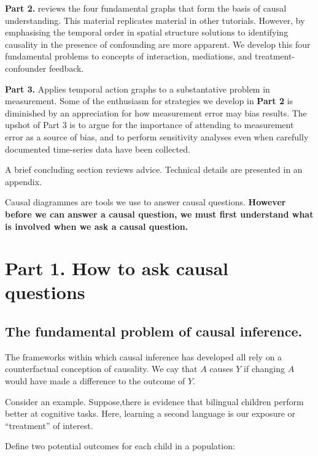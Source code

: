 \documentclass[
  singlecolumn]{report}
\begin{document}
\textbf{Part 2.} reviews the four fundamental graphs that form the basis
of causal understanding. This material replicates material in other
tutorials. However, by emphasising the temporal order in spatial
structure solutions to identifying causality in the presence of
confounding are more apparent. We develop this four fundamental problems
to concepts of interaction, mediations, and treatment-confounder
feedback.

\textbf{Part 3.} Applies temporal action graphs to a substantative
problem in measurement. Some of the enthusiasm for strategies we develop
in \textbf{Part 2} is diminished by an appreciation for how measurement
error may bias results. The upshot of Part 3 is to argue for the
importance of attending to measurement error as a source of bias, and to
perform sensitivity analyses even when carefully documented time-series
data have been collected.

A brief concluding section reviews advice. Technical details are
presented in an appendix.

Causal diagrammes are tools we use to answer causal questions.
\textbf{However before we can answer a causal question, we must first
understand what is involved when we ask a causal question.}

\hypertarget{part-1.-how-to-ask-causal-questions}{%
\section{Part 1. How to ask causal
questions}\label{part-1.-how-to-ask-causal-questions}}

\hypertarget{the-fundamental-problem-of-causal-inference.}{%
\subsection{The fundamental problem of causal
inference.}\label{the-fundamental-problem-of-causal-inference.}}

The frameworks within which causal inference has developed all rely on a
counterfactual conception of causality. We cay that \(A\) causes \(Y\)
if changing \(A\) would have made a difference to the outcome of \(Y\).

Consider an example. Suppose,there is evidence that bilingual children
perform better at cognitive tasks. Here, learning a second language is
our exposure or ``treatment'' of interest.

Define two potential outcomes for each child in a population:
\end{document}
